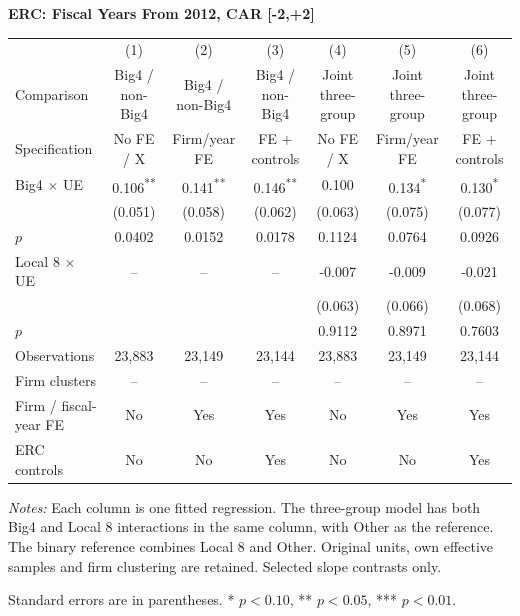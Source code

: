\documentclass[10pt]{article}
\newcommand{\sym}[1]{\textsuperscript{#1}}
\begin{document}
\begin{minipage}{23.60cm}
\fontsize{10}{12}\selectfont
\setlength{\tabcolsep}{4pt}\renewcommand{\arraystretch}{1.08}
{\large\bfseries ERC: Fiscal Years From 2012, CAR [-2,+2]}\par\medskip
\begin{tabular*}{\linewidth}{@{\extracolsep{\fill}}lcccccc@{}}
\toprule
 & (1) & (2) & (3) & (4) & (5) & (6) \\
Comparison & Big4 / non-Big4 & Big4 / non-Big4 & Big4 / non-Big4 & Joint three-group & Joint three-group & Joint three-group \\
Specification & No FE / X & Firm/year FE & FE + controls & No FE / X & Firm/year FE & FE + controls \\
\midrule
Big4 $\times$ UE & 0.106\sym{**} & 0.141\sym{**} & 0.146\sym{**} & 0.100 & 0.134\sym{*} & 0.130\sym{*} \\
 & (0.051) & (0.058) & (0.062) & (0.063) & (0.075) & (0.077) \\
$p$ & 0.0402 & 0.0152 & 0.0178 & 0.1124 & 0.0764 & 0.0926 \\
Local 8 $\times$ UE & -- & -- & -- & -0.007 & -0.009 & -0.021 \\
 &  &  &  & (0.063) & (0.066) & (0.068) \\
$p$ &  &  &  & 0.9112 & 0.8971 & 0.7603 \\
\midrule
Observations & 23,883 & 23,149 & 23,144 & 23,883 & 23,149 & 23,144 \\
Firm clusters & -- & -- & -- & -- & -- & -- \\
Firm / fiscal-year FE & No & Yes & Yes & No & Yes & Yes \\
ERC controls & No & No & Yes & No & No & Yes \\
\bottomrule\end{tabular*}\par\medskip
\fontsize{9}{11}\selectfont\textit{Notes:} Each column is one fitted regression. The three-group model has both Big4 and Local 8 interactions in the same column, with Other as the reference. The binary reference combines Local 8 and Other. Original units, own effective samples and firm clustering are retained. Selected slope contrasts only.
\par Standard errors are in parentheses. * $p<0.10$, ** $p<0.05$, *** $p<0.01$.
\end{minipage}
\end{document}
